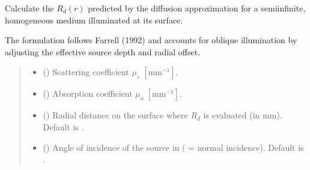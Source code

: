 \documentclass[letterpaper,10pt,english]{sphinxmanual}
\begin{document}
\begin{fulllineitems}
\label{\detokenize{generated/photon_canon.contrib.diffusion_theory:photon_canon.contrib.diffusion_theory.diffusion_approximation}}
\pysigstartsignatures
\pysiglinewithargsret
{}
{\sphinxparamcomma {}\sphinxparamcomma {}\sphinxparamcomma {}\sphinxparamcomma {}\sphinxparamcomma {}}
{}
\pysigstopsignatures
\sphinxAtStartPar
Calculate the  \(R_d(r)\)
predicted by the diffusion approximation for a semi\sphinxhyphen{}infinite,
homogeneous medium illuminated at its surface.

\sphinxAtStartPar
The formulation follows Farrell  (1992) and
accounts for oblique illumination by adjusting the effective
source depth and radial offset.
\begin{quote}\begin{description}
\begin{itemize}
\item {} 
\sphinxAtStartPar
{} () \textendash{} Scattering coefficient \(\mu_s\;[\text{mm}^{-1}]\).

\item {} 
\sphinxAtStartPar
{} () \textendash{} Absorption coefficient \(\mu_a\;[\text{mm}^{-1}]\).

\item {} 
\sphinxAtStartPar
{} (\sphinxstyleliteralemphasis{\sphinxupquote{, }}) \textendash{} Radial distance on the surface where \(R_d\) is evaluated (in mm). Default is .

\item {} 
\sphinxAtStartPar
{} (\sphinxstyleliteralemphasis{\sphinxupquote{, }}) \textendash{} Angle of incidence of the source in  ( = normal incidence). Default is .


\end{itemize}
\end{description}
\end{quote}
\end{fulllineitems}
\end{document}
